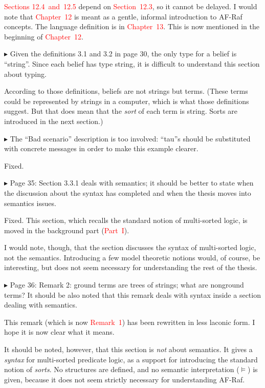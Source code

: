 \documentclass{article}
\newcommand*\R[1]{\textcolor{red}{#1}} %
\newenvironment{them}%
  {\bigskip\noindent\begingroup\color{blue}$\blacktriangleright$\enspace}%
  {\endgroup\par}
\begin{document}
\R{Sections 12.4~and~12.5} depend on \R{Section~12.3},
  so it cannot be delayed.
I would note that \R{Chapter~12} is meant as a gentle, informal
  introduction to AF-Raf concepts.
The language definition is in \R{Chapter~13}.
This is now mentioned in the beginning of \R{Chapter~12}.

\begin{them}
Given the definitions 3.1 and 3.2 in page 30, the only type for a belief is
``string''. Since each belief has type string, it is difficult to understand this
section about typing.
\end{them}
According to those definitions,
  beliefs are not strings but terms.
(These terms could be represented by strings in a computer,
  which is what those definitions suggest.
But that does mean that the \emph{sort} of each term is string.
Sorts are introduced in the next section.)

\begin{them}
The ``Bad scenario'' description is too involved: ``tau''s should be substituted
with concrete messages in order to make this example clearer.
\end{them}
Fixed.

\begin{them}
Page 35:
Section 3.3.1 deals with semantics; it should be better to state when the
discussion about the syntax has completed and when the thesis moves into
semantics issues.
\end{them}
Fixed.
This section,
  which recalls the standard notion of multi-sorted logic,
  is moved in the background part (\R{Part~I}).

I would note, though,
  that the section discusses the syntax of multi-sorted logic,
  not the semantics.
Introducing a few model theoretic notions would, of course, be interesting,
  but does not seem necessary for understanding the rest of the thesis.

\begin{them}
Page 36:
Remark 2: ground terms are trees of strings; what are nonground terms? It
should be also noted that this remark deals with syntax inside a section
dealing with semantics.
\end{them}
This remark (which is now \R{Remark~1}) has been rewritten in less laconic
form. I hope it is now clear what it means.

It should be noted, however, that this section is \emph{not} about semantics.
It gives a \emph{syntax} for multi-sorted predicate logic,
  as a support for introducing the standard notion of \emph{sorts}.
No structures are defined, and no semantic interpretation ($\models$) is given,
  because it does not seem strictly necessary for understanding AF-Raf.
\end{document}
